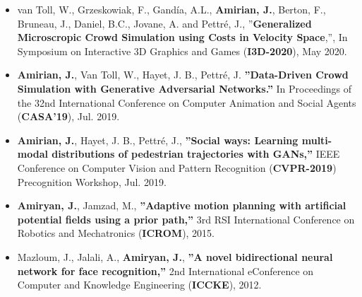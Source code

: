 \documentclass[10pt]{res}
\begin{document}
\begin{resume}
\begin{itemize}
\item van Toll, W., Grzeskowiak, F., Gandía, A.L., \textbf{Amirian, J.}, Berton, F., Bruneau, J., Daniel, B.C., Jovane, A. and Pettré, J., ''\textbf{Generalized Microscropic Crowd Simulation using Costs in Velocity Space},'', In Symposium on Interactive 3D Graphics and Games (\textbf{I3D-2020}), May 2020.

\item {\bf Amirian, J.}, Van Toll, W., Hayet, J. B., Pettré, J. {\bf ''Data-Driven Crowd Simulation with Generative Adversarial Networks.''} In Proceedings of the 32nd International Conference on Computer Animation and Social Agents (\textbf{CASA'19}), Jul. 2019.

\item {\bf Amirian, J.}, Hayet, J. B., Pettré, J., {\bf ''Social ways: Learning multi-modal distributions of pedestrian trajectories with GANs,''} IEEE Conference on Computer Vision and Pattern Recognition (\textbf{CVPR-2019}) Precognition Workshop, Jul. 2019.


\item {\bf Amiryan, J.}, Jamzad, M., {\bf ''Adaptive motion planning with artificial potential fields using a prior path,''} 3rd RSI International Conference on Robotics and Mechatronics (\textbf{ICROM}), 2015.


\item Mazloum, J., Jalali, A., {\bf Amiryan, J.}, {\bf ''A novel bidirectional neural network for face recognition,''} 2nd International eConference on Computer and Knowledge Engineering (\textbf{ICCKE}), 2012.

\end{itemize}



\end{resume}
\end{document}

